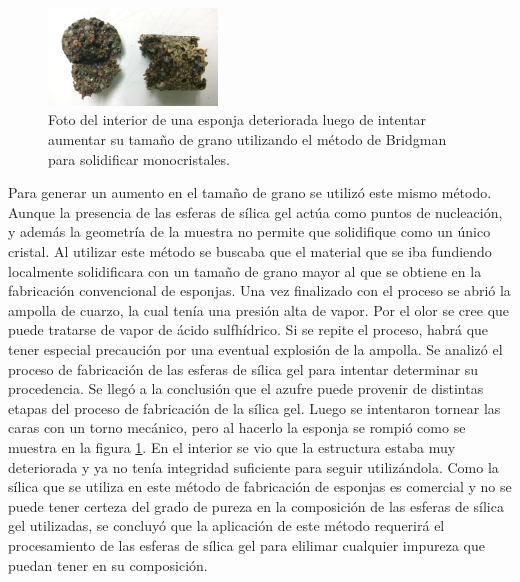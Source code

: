 \documentclass[a4paper,12pt,fleqn,twoside,openany]{book}
\begin{document}
 \begin{figure}
 \centering
 \includegraphics[width=0.4\textwidth]{Img/Resultados/EspRota.jpg}
 \caption{Foto del interior de una esponja deteriorada luego de intentar aumentar su tamaño de grano utilizando el método de Bridgman para solidificar monocristales.} 
 \label{fig: EspRota}
 \end{figure}

Para generar un aumento en el tamaño de grano se utilizó este mismo método. Aunque la presencia de las esferas de sílica gel actúa como puntos de nucleación, y además la geometría de la muestra no permite que solidifique como un único cristal. Al utilizar este método se buscaba que el material que se iba fundiendo localmente solidificara con un tamaño de grano mayor al que se obtiene en la fabricación convencional de esponjas. Una vez finalizado con el proceso se abrió la ampolla de cuarzo, la cual tenía una presión alta de vapor. Por el olor se cree que puede tratarse de vapor de ácido sulfhídrico. Si se repite el proceso, habrá que tener especial precaución por una eventual explosión de la ampolla. Se analizó el proceso de fabricación de las esferas de sílica gel para intentar determinar su procedencia. Se llegó a la conclusión que el azufre puede provenir de distintas etapas del proceso de fabricación de la sílica gel. Luego se intentaron tornear las caras con un torno mecánico, pero al hacerlo la esponja se rompió como se muestra en la figura \ref{fig: EspRota}. En el interior se vio que la estructura estaba muy deteriorada y ya no tenía integridad suficiente para seguir utilizándola. Como la sílica que se utiliza en este método de fabricación de esponjas es comercial y no se puede tener certeza del grado de pureza en la composición de las esferas de sílica gel utilizadas, se concluyó que la aplicación de este método requerirá el procesamiento de las esferas de sílica gel para elilimar cualquier impureza que puedan tener en su composición. 




% 
\end{document}
